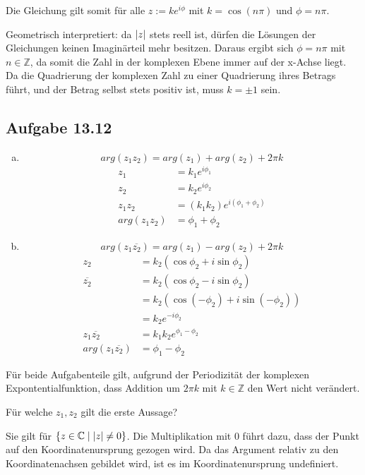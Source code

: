 \documentclass{standalone}
\begin{document}
Die Gleichung gilt somit für alle $z:=ke^{i\phi}$ mit $k = \cos(n\pi)$ und $\phi = n\pi$.

Geometrisch interpretiert: da $\lvert z\rvert$ stets reell ist, dürfen die Lösungen der Gleichungen keinen Imaginärteil mehr besitzen. Daraus ergibt sich $\phi = n\pi$ mit $n \in \mathbb{Z}$, da somit die Zahl in der komplexen Ebene immer auf der x-Achse liegt.
Da die Quadrierung der komplexen Zahl zu einer Quadrierung ihres Betrags führt, und der Betrag selbst stets positiv ist, muss $k = \pm 1$ sein.

\subsection{Aufgabe 13.12}

\begin{enumerate}[a)]
    \item $$ arg(z_1 z_2) = arg(z_1) + arg(z_2) + 2\pi k$$
    \begin{align}
        z_1 &= k_1 e^{i\phi_1} \\
        z_2 &= k_2 e^{i\phi_2} \\
        z_1 z_2 &= (k_1 k_2) e^{i (\phi_1 + \phi_2)} \\
        arg(z_1 z_2) &= \phi_1 + \phi_2
    \end{align}
    \item $$ arg(z_1 \overline{z_2}) = arg(z_1) - arg(z_2) + 2\pi k $$
    \begin{align}
        z_2 &= k_2 (\cos \phi_2 + i \sin \phi_2) \\
        \overline{z_2} &= k_2(\cos \phi_2 - i \sin \phi_2) \\
        &= k_2(\cos (-\phi_2) + i \sin (-\phi_2)) \\
        &= k_2e^{-i\phi_2} \\
        z_1 \overline{z_2} &= k_1 k_2 e^{\phi_1 - \phi_2} \\
        arg(z_1 \overline{z_2}) &= \phi_1 - \phi_2
    \end{align}
\end{enumerate}
Für beide Aufgabenteile gilt, aufgrund der Periodizität der komplexen Expontentialfunktion, dass Addition um $2 \pi k $ mit $k \in \mathbb{Z}$ den Wert nicht verändert.

Für welche $z_1,z_2$ gilt die erste Aussage?

Sie gilt für $\{z \in \mathbb{C} \mid \lvert z\rvert \neq 0\}$. Die Multiplikation mit $0$ führt dazu, dass der Punkt auf den Koordinatenursprung gezogen wird. Da das Argument relativ zu den Koordinatenachsen gebildet wird, ist es im Koordinatenursprung undefiniert.
\end{document}
